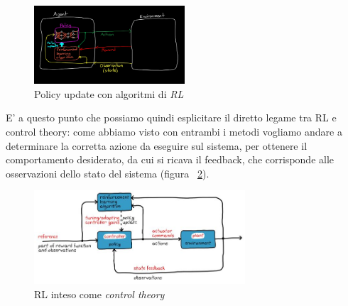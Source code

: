 \begin{figure}[!h]
	\centering
	\includegraphics[width=0.5\textwidth]{Immagini/Policy_update.png}
	\caption{Policy update con algoritmi di \textit{RL}}
	\label{fig:Policy_update}
\end{figure}


E' a questo punto che possiamo quindi esplicitare il diretto legame tra RL e control theory: come abbiamo visto con entrambi i metodi vogliamo andare a determinare la corretta azione da eseguire sul sistema, per ottenere il comportamento desiderato, da cui si ricava il feedback, che corrisponde alle osservazioni dello stato del sistema (figura ~\ref{fig:RL_Control}).

\begin{figure}[!h]
	\centering
	\includegraphics[width=0.7\textwidth]{Immagini/RL_Control.JPG}
	\caption{RL inteso come \textit{control theory}}
	\label{fig:RL_Control}
\end{figure}